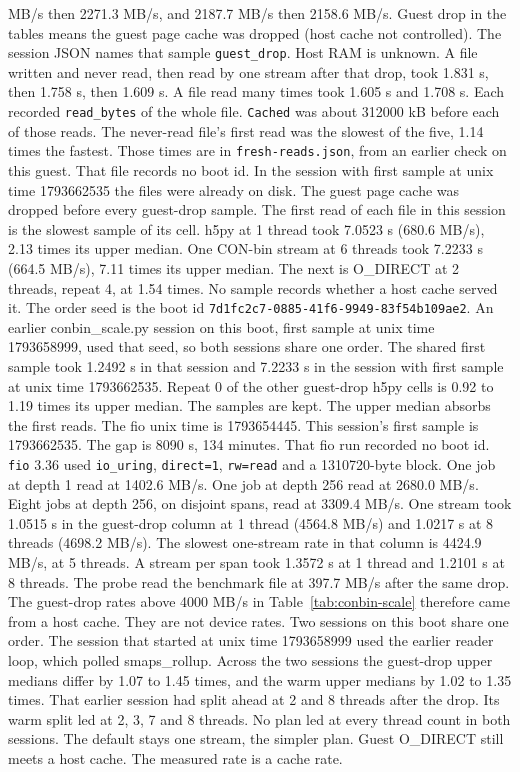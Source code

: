MB/s then 2271.3 MB/s, and 2187.7 MB/s then 2158.6 MB/s.
Guest drop in the tables means the guest page cache was dropped (host
cache not controlled).
The session JSON names that sample \texttt{guest\_drop}.
Host RAM is unknown.
A file written and never read, then read by one stream after that drop,
took 1.831 s, then 1.758 s, then 1.609 s.
A file read many times took 1.605 s and 1.708 s.
Each recorded \texttt{read\_bytes} of the whole file.
\texttt{Cached} was about 312000 kB before each of those reads.
The never-read file's first read was the slowest of the five, 1.14 times
the fastest.
Those times are in \texttt{fresh-reads.json}, from an earlier check on
this guest.
That file records no boot id.
In the session with first sample at unix time 1793662535 the files were
already on disk.
The guest page cache was dropped before every guest-drop sample.
The first read of each file in this session is the slowest sample of its
cell.
h5py at 1 thread took 7.0523 s (680.6 MB/s), 2.13 times its upper
median.
One CON-bin stream at 6 threads took 7.2233 s (664.5 MB/s), 7.11 times
its upper median.
The next is O\_DIRECT at 2 threads, repeat 4, at 1.54 times.
No sample records whether a host cache served it.
The order seed is the boot id
\texttt{7d1fc2c7-0885-41f6-9949-83f54b109ae2}.
An earlier conbin\_scale.py session on this boot, first sample at unix
time 1793658999, used that seed, so both sessions share one order.
The shared first sample took 1.2492 s in that session and 7.2233 s in
the session with first sample at unix time 1793662535.
Repeat 0 of the other guest-drop h5py cells is 0.92 to 1.19 times its
upper median.
The samples are kept.
The upper median absorbs the first reads.
The fio unix time is 1793654445.
This session's first sample is 1793662535.
The gap is 8090 s, 134 minutes.
That fio run recorded no boot id.
\texttt{fio} 3.36 used \texttt{io\_uring}, \texttt{direct=1},
\texttt{rw=read} and a 1310720-byte block.
One job at depth 1 read at 1402.6 MB/s.
One job at depth 256 read at 2680.0 MB/s.
Eight jobs at depth 256, on disjoint spans, read at 3309.4 MB/s.
One stream took 1.0515 s in the guest-drop column at 1 thread (4564.8
MB/s) and 1.0217 s at 8 threads (4698.2 MB/s).
The slowest one-stream rate in that column is 4424.9 MB/s, at 5 threads.
A stream per span took 1.3572 s at 1 thread and 1.2101 s at 8 threads.
The probe read the benchmark file at 397.7 MB/s after the same drop.
The guest-drop rates above 4000 MB/s in Table~\ref{tab:conbin-scale}
therefore came from a host cache.
They are not device rates.
Two sessions on this boot share one order.
The session that started at unix time 1793658999 used the earlier reader
loop, which polled smaps_rollup.
Across the two sessions the guest-drop upper medians differ by 1.07 to
1.45 times, and the warm upper medians by 1.02 to 1.35 times.
That earlier session had split ahead at 2 and 8 threads after the drop.
Its warm split led at 2, 3, 7 and 8 threads.
No plan led at every thread count in both sessions.
The default stays one stream, the simpler plan.
Guest O\_DIRECT still meets a host cache.
The measured rate is a cache rate.

